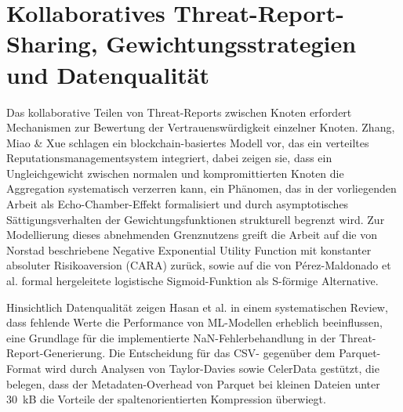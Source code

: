 \section{Kollaboratives Threat-Report-Sharing, Gewichtungsstrategien und Datenqualität}
Das kollaborative Teilen von Threat-Reports zwischen Knoten erfordert Mechanismen zur Bewertung der Vertrauenswürdigkeit einzelner Knoten. Zhang, Miao \& Xue \cite{zhang2022reputation} schlagen ein blockchain-basiertes Modell vor, das ein verteiltes Reputationsmanagementsystem integriert, dabei zeigen sie, dass ein Ungleichgewicht zwischen normalen und kompromittierten Knoten die Aggregation systematisch verzerren kann, ein Phänomen, das in der vorliegenden Arbeit als Echo-Chamber-Effekt formalisiert und durch asymptotisches Sättigungsverhalten der Gewichtungsfunktionen strukturell begrenzt wird. Zur Modellierung dieses abnehmenden Grenznutzens greift die Arbeit auf die von Norstad \cite{norstad1999utility} beschriebene Negative Exponential Utility Function mit konstanter absoluter Risikoaversion (CARA) zurück, sowie auf die von Pérez-Maldonado et al. \cite{perezmaldonado2025sigmoid} formal hergeleitete logistische Sigmoid-Funktion als S-förmige Alternative.

Hinsichtlich Datenqualität zeigen Hasan et al. \cite{hasan2021missingvalue} in einem systematischen Review, dass fehlende Werte die Performance von ML-Modellen erheblich beeinflussen, eine Grundlage für die implementierte NaN-Fehlerbehandlung in der Threat-Report-Generierung. Die Entscheidung für das CSV- gegenüber dem Parquet-Format wird durch Analysen von Taylor-Davies \cite{taylordavies2023parquet} sowie CelerData \cite{celerdata2024parquet} gestützt, die belegen, dass der Metadaten-Overhead von Parquet bei kleinen Dateien unter 30~kB die Vorteile der spaltenorientierten Kompression überwiegt.